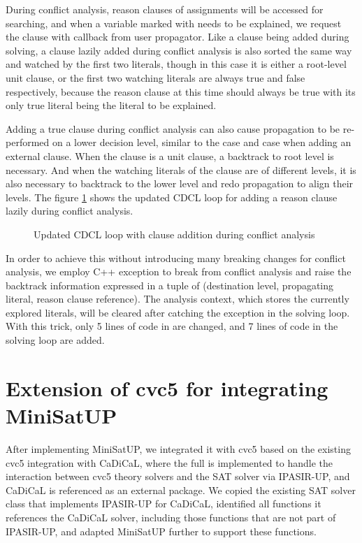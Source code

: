 During conflict analysis, reason clauses of assignments will be accessed for searching, and when a variable marked with  needs to be explained, we request the clause with callback  from user propagator. Like a clause being added during solving, a clause lazily added during conflict analysis is also sorted the same way and watched by the first two literals, though in this case it is either a root-level unit clause, or the first two watching literals are always true and false respectively, because the reason clause at this time should always be true with its only true literal being the literal to be explained.

Adding a true clause during conflict analysis can also cause propagation to be re-performed on a lower decision level, similar to the  case and  case when adding an external clause. When the clause is a unit clause, a backtrack to root level is necessary. And when the watching literals of the clause are of different levels, it is also necessary to backtrack to the lower level and redo propagation to align their levels. The figure \ref{fig:analyze} shows the updated CDCL loop for adding a reason clause lazily during conflict analysis.

\begin{figure}[h!]
  \centering
  
  \caption{Updated CDCL loop with clause addition during conflict analysis}
  \label{fig:analyze}
\end{figure}

In order to achieve this without introducing many breaking changes for conflict analysis, we employ C++ exception to break from conflict analysis and raise the backtrack information expressed in a tuple of (destination level, propagating literal, reason clause reference). The analysis context, which stores the currently explored literals, will be cleared after catching the exception in the solving loop. With this trick, only 5 lines of code in  are changed, and 7 lines of code in the solving loop are added.

\section{Extension of cvc5 for integrating MiniSatUP}

After implementing MiniSatUP, we integrated it with cvc5 based on the existing cvc5 integration with CaDiCaL, where the full  is implemented to handle the interaction between cvc5 theory solvers and the SAT solver via IPASIR-UP, and CaDiCaL is referenced as an external package. We copied the existing SAT solver class that implements IPASIR-UP for CaDiCaL, identified all functions it references the CaDiCaL solver, including those functions that are not part of IPASIR-UP, and adapted MiniSatUP further to support these functions.


